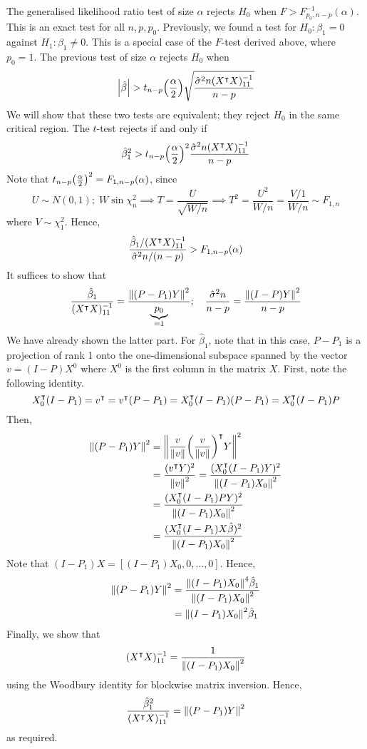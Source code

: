The generalised likelihood ratio test of size \( \alpha \) rejects \( H_0 \) when \( F > F^{-1}_{p_0,n-p}(\alpha) \).
This is an exact test for all \( n, p, p_0 \).
Previously, we found a test for \( H_0\colon \beta_1 = 0 \) against \( H_1 \colon \beta_1 \neq 0 \).
This is a special case of the \( F \)-test derived above, where \( p_0 = 1 \).
The previous test of size \( \alpha \) rejects \( H_0 \) when
\[
	\abs{\hat\beta} > t_{n-p}\qty(\frac{\alpha}{2}) \sqrt{\frac{\hat\sigma^2 n (X^\intercal X)^{-1}_{11}}{n-p}}
\]
We will show that these two tests are equivalent; they reject \( H_0 \) in the same critical region.
The \( t \)-test rejects if and only if
\[
	\hat \beta_1^2 > t_{n-p}\qty(\frac{\alpha}{2})^2 \frac{\hat\sigma^2 n (X^\intercal X)^{-1}_{11}}{n-p}
\]
Note that \( t_{n-p}\qty(\frac{\alpha}{2})^2 = F_{1,n-p}(\alpha) \), since
\[
	U \sim N(0,1);\;W \sin \chi^2_n \implies T = \frac{U}{\sqrt{W/n}} \implies T^2 = \frac{U^2}{W/n} = \frac{V/1}{W/n} \sim F_{1,n}
\]
where \( V \sim \chi^2_1 \).
Hence,
\[
	\frac{\hat \beta_1/(X^\intercal X)^{-1}_{11}}{\hat\sigma^2 n/(n-p)} > F_{1,n-p}(\alpha)
\]
It suffices to show that
\[
	\frac{\hat \beta_1}{(X^\intercal X)^{-1}_{11}} = \frac{\norm{(P-P_1)Y}^2}{\underbrace{p_0}_{=1}};\quad \frac{\hat \sigma^2 n}{n-p} = \frac{\norm{(I-P)Y}^2}{n-p}
\]
We have already shown the latter part.
For \( \hat \beta_1 \), note that in this case, \( P - P_1 \) is a projection of rank 1 onto the one-dimensional subspace spanned by the vector \( v = (I-P)X^0 \) where \( X^0 \) is the first column in the matrix \( X \).
First, note the following identity.
\[
	X_0^\intercal (I - P_1) = v^\intercal = v^\intercal (P-P_1) = X_0^\intercal (I-P_1)(P-P_1) = X_0^\intercal (I-P_1)P
\]
Then,
\begin{align*}
	\norm{(P-P_1)Y}^2 & = \norm{\frac{v}{\norm{v}} \qty(\frac{v}{\norm{v}})^\intercal Y}^2                                 \\
	                  & = \frac{(v^\intercal Y)^2}{\norm{v}^2} = \frac{(X_0^\intercal (I-P_1) Y)^2}{\norm{(I-P_1) X_0}^2} \\
	                  & = \frac{(X_0^\intercal (I-P_1) P Y)^2}{\norm{(I-P_1) X_0}^2}                                       \\
	                  & = \frac{(X_0^\intercal (I-P_1) X \hat\beta)^2}{\norm{(I-P_1) X_0}^2}
\end{align*}
Note that \( (I-P_1) X = [(I-P_1)X_0, 0, \dots, 0] \).
Hence,
\begin{align*}
	\norm{(P-P_1)Y}^2 & = \frac{\norm{(I-P_1)X_0}^4 \hat \beta_1}{\norm{(I-P_1)X_0}^2} \\
	                  & = \norm{(I-P_1)X_0}^2 \hat \beta_1
\end{align*}
Finally, we show that
\[
	(X^\intercal X)^{-1}_{11} = \frac{1}{\norm{(I-P_1)X_0}^2}
\]
using the Woodbury identity for blockwise matrix inversion.
Hence,
\[
	\frac{\hat\beta_1^2}{(X^\intercal X)^{-1}_{11}} = \norm{(P-P_1) Y}^2
\]
as required.

